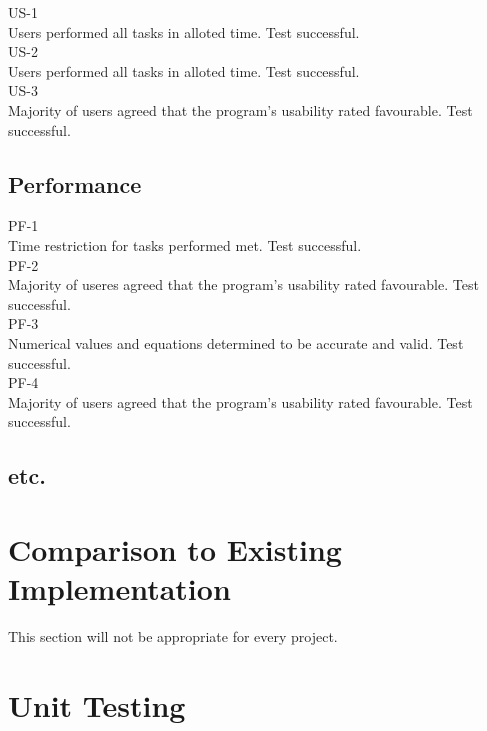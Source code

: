 \documentclass[12pt, titlepage]{article}
\begin{document}
US-1\\

Users performed all tasks in alloted time. Test successful.\\

US-2\\

Users performed all tasks in alloted time. Test successful.\\

US-3\\

Majority of users agreed that the program's usability rated favourable. Test successful.

\subsection{Performance}

PF-1\\

Time restriction for tasks performed met. Test successful.\\

PF-2\\

Majority of useres agreed that the program's usability rated favourable. Test successful.\\

PF-3\\

Numerical values and equations determined to be accurate and valid. Test successful.\\

PF-4\\

Majority of users agreed that the program's usability rated favourable. Test successful.

\subsection{etc.}
	
\section{Comparison to Existing Implementation}	

This section will not be appropriate for every project.

\section{Unit Testing}
\end{document}

